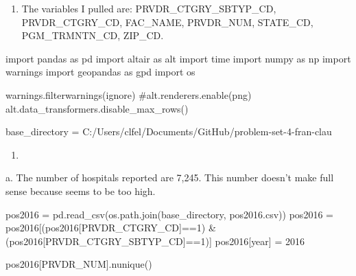 \documentclass[
  letterpaper,
  DIV=11,
  numbers=noendperiod]{scrartcl}
\newenvironment{Shaded}{\begin{snugshade}}{\end{snugshade}}
\newcommand{\CommentTok}[1]{\textcolor[rgb]{0.37,0.37,0.37}{#1}}
\newcommand{\DecValTok}[1]{\textcolor[rgb]{0.68,0.00,0.00}{#1}}
\newcommand{\ImportTok}[1]{\textcolor[rgb]{0.00,0.46,0.62}{#1}}
\newcommand{\NormalTok}[1]{\textcolor[rgb]{0.00,0.23,0.31}{#1}}
\newcommand{\OperatorTok}[1]{\textcolor[rgb]{0.37,0.37,0.37}{#1}}
\newcommand{\StringTok}[1]{\textcolor[rgb]{0.13,0.47,0.30}{#1}}
\providecommand{\tightlist}{%
  \setlength{\itemsep}{0pt}\setlength{\parskip}{0pt}}\usepackage{longtable,booktabs,array}
\begin{document}
\begin{enumerate}
\def\labelenumi{\arabic{enumi}.}
\tightlist
\item
  The variables I pulled are: PRVDR\_CTGRY\_SBTYP\_CD, PRVDR\_CTGRY\_CD,
  FAC\_NAME, PRVDR\_NUM, STATE\_CD, PGM\_TRMNTN\_CD, ZIP\_CD.
\end{enumerate}

\begin{Shaded}
\begin{Highlighting}[]
\ImportTok{import}\NormalTok{ pandas }\ImportTok{as}\NormalTok{ pd}
\ImportTok{import}\NormalTok{ altair }\ImportTok{as}\NormalTok{ alt}
\ImportTok{import}\NormalTok{ time}
\ImportTok{import}\NormalTok{ numpy }\ImportTok{as}\NormalTok{ np}
\ImportTok{import}\NormalTok{ warnings}
\ImportTok{import}\NormalTok{ geopandas }\ImportTok{as}\NormalTok{ gpd}
\ImportTok{import}\NormalTok{ os}

\NormalTok{warnings.filterwarnings(}\StringTok{\textquotesingle{}ignore\textquotesingle{}}\NormalTok{)}
\CommentTok{\#alt.renderers.enable(\textquotesingle{}png\textquotesingle{})}
\NormalTok{alt.data\_transformers.disable\_max\_rows()}

\NormalTok{base\_directory }\OperatorTok{=} \StringTok{\textquotesingle{}C:/Users/clfel/Documents/GitHub/problem{-}set{-}4{-}fran{-}clau\textquotesingle{}}
\end{Highlighting}
\end{Shaded}

\begin{enumerate}
\def\labelenumi{\arabic{enumi}.}
\setcounter{enumi}{1}
\tightlist
\item
\end{enumerate}

\hfill\break
a. The number of hospitals reported are 7,245. This number doesn't make
full sense because seems to be too high.

\begin{Shaded}
\begin{Highlighting}[]
\NormalTok{pos2016 }\OperatorTok{=}\NormalTok{ pd.read\_csv(os.path.join(base\_directory, }\StringTok{\textquotesingle{}pos2016.csv\textquotesingle{}}\NormalTok{))}
\NormalTok{pos2016 }\OperatorTok{=}\NormalTok{ pos2016[(pos2016[}\StringTok{\textquotesingle{}PRVDR\_CTGRY\_CD\textquotesingle{}}\NormalTok{]}\OperatorTok{==}\DecValTok{1}\NormalTok{) }\OperatorTok{\&}\NormalTok{ (pos2016[}\StringTok{\textquotesingle{}PRVDR\_CTGRY\_SBTYP\_CD\textquotesingle{}}\NormalTok{]}\OperatorTok{==}\DecValTok{1}\NormalTok{)]}
\NormalTok{pos2016[}\StringTok{\textquotesingle{}year\textquotesingle{}}\NormalTok{] }\OperatorTok{=} \DecValTok{2016}

\NormalTok{pos2016[}\StringTok{\textquotesingle{}PRVDR\_NUM\textquotesingle{}}\NormalTok{].nunique()}
\end{Highlighting}
\end{Shaded}
\end{document}
